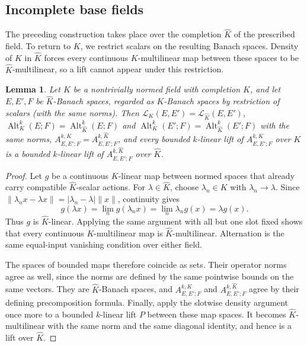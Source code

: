 \documentclass[11pt]{amsart}
\newtheorem{lemma}[theorem]{Lemma}
\theoremstyle{definition}
\theoremstyle{remark}
\numberwithin{equation}{section}
\newcommand{\cL}{\mathcal L}
\newcommand{\Alt}{\operatorname{Alt}}
\newcommand{\abs}[1]{\lvert #1\rvert}
\newcommand{\norm}[1]{\lVert #1\rVert}
\newcommand{\Kh}{\widehat K}
\theoremstyle{plain}
\theoremstyle{definition}
\theoremstyle{plain}
\begin{document}
\subsection{Incomplete base fields}
The preceding construction takes place over the completion $\Kh$ of the prescribed field. To return to $K$,
we restrict scalars on the resulting Banach spaces. Density of $K$ in $\Kh$ forces every continuous
$K$\nobreakdash-multilinear map between these spaces to be $\Kh$\nobreakdash-multilinear, so a lift cannot appear under
this restriction.

\begin{lemma}\label{lem:descent}
Let $K$ be a nontrivially normed field with completion $\Kh$, and let $E,E',F$ be $\Kh$\nobreakdash-Banach spaces, regarded as
$K$\nobreakdash-Banach spaces by restriction of scalars (with the same norms). Then $\cL_K(E,E')=\cL_{\Kh}(E,E')$,
$\Alt^k_K(E;F)=\Alt^k_{\Kh}(E;F)$ and $\Alt^k_K(E';F)=\Alt^k_{\Kh}(E';F)$ with the same norms, $A^{k,K}_{E,E';F}=A^{k,\Kh}_{E,E';F}$,
and every bounded $k$\nobreakdash-linear lift of $A^{k,K}_{E,E';F}$ over $K$ is a bounded $k$\nobreakdash-linear lift of $A^{k,\Kh}_{E,E';F}$ over
$\Kh$.
\end{lemma}

\begin{proof}
Let $g$ be a continuous $K$\nobreakdash-linear map between normed spaces that already carry compatible
$\Kh$\nobreakdash-scalar actions. For $\lambda\in\Kh$, choose $\lambda_n\in K$ with $\lambda_n\to\lambda$.
Since $\norm{\lambda_nx-\lambda x}=\abs{\lambda_n-\lambda}\norm x$, continuity gives
\[
g(\lambda x)=\lim_n g(\lambda_nx)=\lim_n\lambda_ng(x)=\lambda g(x).
\]
Thus $g$ is $\Kh$\nobreakdash-linear. Applying the same argument with all but one slot fixed shows that every
continuous $K$\nobreakdash-multilinear map is $\Kh$\nobreakdash-multilinear. Alternation is the same equal-input
vanishing condition over either field.

The spaces of bounded maps therefore coincide as sets. Their operator norms agree as well, since the norms are
defined by the same pointwise bounds on the same vectors. They are $\Kh$\nobreakdash-Banach spaces, and
$A^{k,K}_{E,E';F}$ and $A^{k,\Kh}_{E,E';F}$ agree by their defining precomposition formula.
Finally, apply the slotwise density argument once more to a bounded $k$\nobreakdash-linear lift $P$ between these
map spaces. It becomes $\Kh$\nobreakdash-multilinear with the same norm and the same diagonal identity, and hence
is a lift over $\Kh$.
\end{proof}
\end{document}
